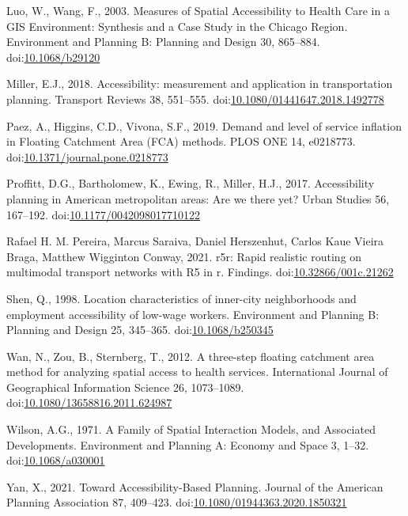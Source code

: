 \documentclass[]{elsarticle} %
\newlength{\cslhangindent}
\newlength{\cslentryspacingunit} %
\newenvironment{CSLReferences}[2] %
 {%
  \setlength{\parindent}{0pt}
  \ifodd #1
  \let\oldpar\par
  \def\par{\hangindent=\cslhangindent\oldpar}
  \fi
  \setlength{\parskip}{#2\cslentryspacingunit}
 }%
 {}
\begin{document}
\begin{CSLReferences}{1}{0}
\leavevmode{}%
Luo, W., Wang, F., 2003. Measures of Spatial Accessibility to Health
Care in a GIS Environment: Synthesis and a Case Study in the Chicago
Region. Environment and Planning B: Planning and Design 30, 865--884.
doi:\href{https://doi.org/10.1068/b29120}{10.1068/b29120}

\leavevmode{}%
Miller, E.J., 2018. Accessibility: measurement and application in
transportation planning. Transport Reviews 38, 551--555.
doi:\href{https://doi.org/10.1080/01441647.2018.1492778}{10.1080/01441647.2018.1492778}

\leavevmode{}%
Paez, A., Higgins, C.D., Vivona, S.F., 2019. Demand and level of service
inflation in Floating Catchment Area (FCA) methods. PLOS ONE 14,
e0218773.
doi:\href{https://doi.org/10.1371/journal.pone.0218773}{10.1371/journal.pone.0218773}

\leavevmode{}%
Proffitt, D.G., Bartholomew, K., Ewing, R., Miller, H.J., 2017.
Accessibility planning in American metropolitan areas: Are we there yet?
Urban Studies 56, 167--192.
doi:\href{https://doi.org/10.1177/0042098017710122}{10.1177/0042098017710122}

\leavevmode{}%
Rafael H. M. Pereira, Marcus Saraiva, Daniel Herszenhut, Carlos Kaue
Vieira Braga, Matthew Wigginton Conway, 2021. r5r: Rapid realistic
routing on multimodal transport networks with R5 in r. Findings.
doi:\href{https://doi.org/10.32866/001c.21262}{10.32866/001c.21262}

\leavevmode{}%
Shen, Q., 1998. Location characteristics of inner-city neighborhoods and
employment accessibility of low-wage workers. Environment and Planning
B: Planning and Design 25, 345--365.
doi:\href{https://doi.org/10.1068/b250345}{10.1068/b250345}

\leavevmode{}%
Wan, N., Zou, B., Sternberg, T., 2012. A three-step floating catchment
area method for analyzing spatial access to health services.
International Journal of Geographical Information Science 26,
1073--1089.
doi:\href{https://doi.org/10.1080/13658816.2011.624987}{10.1080/13658816.2011.624987}

\leavevmode{}%
Wilson, A.G., 1971. A Family of Spatial Interaction Models, and
Associated Developments. Environment and Planning A: Economy and Space
3, 1--32. doi:\href{https://doi.org/10.1068/a030001}{10.1068/a030001}

\leavevmode{}%
Yan, X., 2021. Toward Accessibility-Based Planning. Journal of the
American Planning Association 87, 409--423.
doi:\href{https://doi.org/10.1080/01944363.2020.1850321}{10.1080/01944363.2020.1850321}

\end{CSLReferences}
\end{document}
